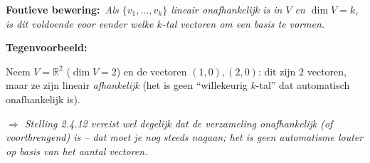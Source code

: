 \documentclass[10pt,a4paper]{article}
\newenvironment{ce}[1]{%
  \par\noindent\textbf{Foutieve bewering:}~\textit{#1}\par\noindent\textbf{Tegenvoorbeeld:}~\ignorespaces
}{%
  \par\vspace{5pt}\normalfont
}
\newcommand{\concl}[1]{\par\noindent\textit{$\Rightarrow$ #1}}
\begin{document}
\begin{ce}{Als $\{v_1,\dots,v_k\}$ lineair onafhankelijk is in $V$ en $\dim V=k$, is dit voldoende voor eender welke $k$-tal vectoren om een basis te vormen.}
Neem $V=\mathbb R^2$ ($\dim V=2$) en de vectoren $(1,0),(2,0)$: dit zijn $2$ vectoren, maar ze zijn lineair \emph{afhankelijk} (het is geen ``willekeurig $k$-tal'' dat automatisch onafhankelijk is).
\concl{Stelling 2.4.12 vereist wel degelijk dat de verzameling onafhankelijk (of voortbrengend) \emph{is} -- dat moet je nog steeds nagaan; het is geen automatisme louter op basis van het aantal vectoren.}
\end{ce}
\end{document}
